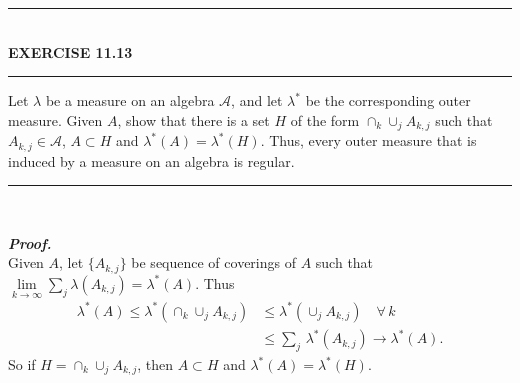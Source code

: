 \documentclass[a4paper,11pt]{article}
\begin{document}
\newpage
	\begin{flushleft}
		\rule[-0.5ex]{17cm}{2pt}\\
			\textbf{EXERCISE 11.13}\\
		\rule[1.5ex]{17cm}{0.5pt}
			Let $\lambda$ be a measure on an algebra $\mathscr{A}$, and let $\lambda^*$ be the corresponding outer measure. Given $A$, show that there is a set $H$ of the form $\cap_k \cup_j A_{k,j}$ such that $A_{k,j} \in \mathscr{A}$, $A \subset H$ and $\lambda^*(A) = \lambda^*(H)$. Thus, every outer measure that is induced by a measure on an algebra is regular.
		\rule[1.0ex]{17cm}{0.5pt}\
	\end{flushleft}
	\textbf{\textit{Proof.}}\\
	Given $A$, let $\{A_{k,j}\}$ be sequence of coverings of $A$ such that $\underset{k \to \infty}{\lim} \sum_j \lambda(A_{k,j}) = \lambda^*(A)$. Thus
		$$\begin{aligned}
		\lambda^*(A)
		\leq \lambda^* \left(\cap_k \cup _j A_{k,j} \right)
		&\leq \lambda^* \left(\cup _j A_{k,j} \right)
		\quad \forall\,k\\
		&\leq \sum_j\,\lambda^*(A_{k,j})
		\to \lambda^*(A).
		\end{aligned}$$
	So if $H = \cap_k \cup _j A_{k,j}$, then $A \subset H$ and $\lambda^*(A) = \lambda^*(H)$.\\
\end{document}

